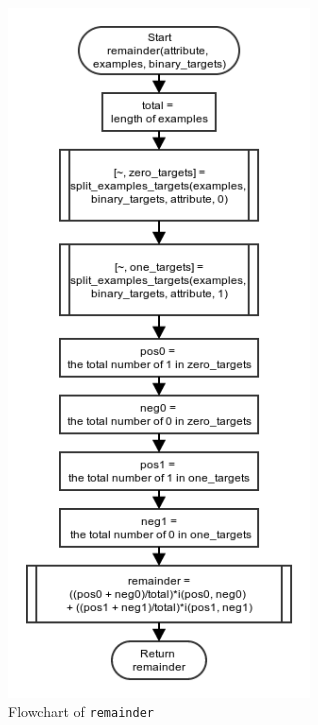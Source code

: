 \documentclass[10pt,a4paper]{article}
\begin{document}
\begin{figure}[!ht]
	\centering
	\includegraphics[width=8cm]{images/flow_chart/remainder.png}
	\caption{Flowchart of \tt{remainder}}
	\label{fig:remainder}
\end{figure}
\end{document}
